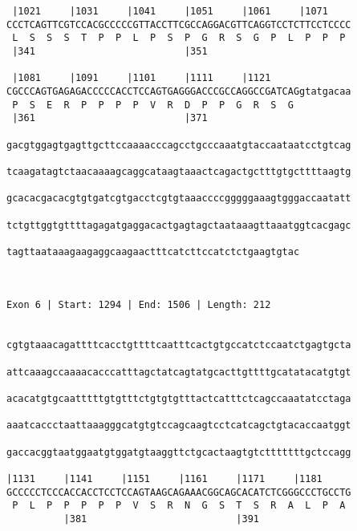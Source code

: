 \documentclass{article}
\begin{document}
\begin{Verbatim}
 |1021     |1031     |1041     |1051     |1061     |1071    
CCCTCAGTTCGTCCACGCCCCCGTTACCTTCGCCAGGACGTTCAGGTCCTCTTCCTCCCC
 L  S  S  S  T  P  P  L  P  S  P  G  R  S  G  P  L  P  P  P 
 |341                          |351                         
  
 |1081     |1091     |1101     |1111     |1121              
CGCCCAGTGAGAGACCCCCACCTCCAGTGAGGGACCCGCCAGGCCGATCAGgtatgacaa
 P  S  E  R  P  P  P  P  V  R  D  P  P  G  R  S  G          
 |361                          |371                         
  
gacgtggagtgagttgcttccaaaacccagcctgcccaaatgtaccaataatcctgtcag
                                                            
tcaagatagtctaacaaaagcaggcataagtaaactcagactgctttgtgcttttaagtg
                                                            
gcacacgacacgtgtgatcgtgacctcgtgtaaaccccgggggaaagtgggaccaatatt
                                                            
tctgttggtgttttagagatgaggacactgagtagctaataaagttaaatggtcacgagc
                                                            
tagttaataaagaagaggcaagaactttcatcttccatctctgaagtgtac
                                                   
                                                   
 
Exon 6 | Start: 1294 | End: 1506 | Length: 212


cgtgtaaacagattttcacctgttttcaatttcactgtgccatctccaatctgagtgcta
                                                            
attcaaagccaaaacacccatttagctatcagtatgcacttgttttgcatatacatgtgt
                                                            
acacatgtgcaatttttgtgtttctgtgtgtttactcatttctcagccaaatatcctaga
                                                            
aaatcaccctaattaaagggcatgtgtccagcaagtcctcatcagctgtacaccaatggt
                                                            
gaccacggtaatggaatgtggatgtaaggttctgcactaagtgtctttttttgctccagg
                                                            
|1131     |1141     |1151     |1161     |1171     |1181     
GCCCCCTCCCACCACCTCCTCCAGTAAGCAGAAACGGCAGCACATCTCGGGCCCTGCCTG
 P  L  P  P  P  P  P  V  S  R  N  G  S  T  S  R  A  L  P  A 
          |381                          |391                
  

\end{Verbatim}
\end{document}
